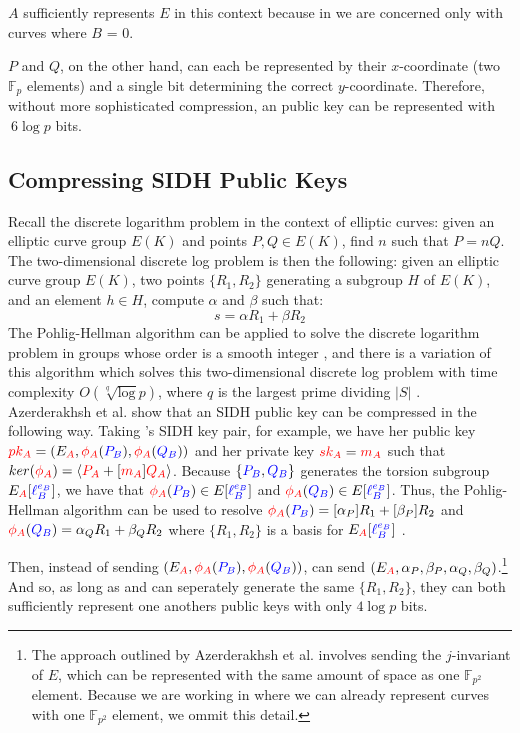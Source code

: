 $A$ sufficiently represents $E$ in this context because in \sidh we are concerned only with curves where $B$ = 0. 

$P$ and $Q$, on the other hand, can each be represented by their $x$-coordinate (two $\mathbb{F}_{p}$ elements) and a single bit determining the correct $y$-coordinate. Therefore, without more sophisticated compression, an \sidh public key can be represented with $~6\log p$ bits.

\subsection{Compressing SIDH Public Keys}
\label{subsec:azercompression}

Recall the discrete logarithm problem in the context of elliptic curves: given an elliptic curve group $E(K)$ and points $P, Q \in E(K)$, find $n$ such that $P = nQ$. The two-dimensional discrete log problem is then the following: given an elliptic curve group $E(K)$, two points $\{R_1, R_2\}$ generating a subgroup $H$ of $E(K)$, and an element $h \in H$, compute $\alpha$ and $\beta$ such that:
$$
s = \alpha R_1 + \beta R_2
$$
The Pohlig-Hellman algorithm can be applied to solve the discrete logarithm problem in groups whose order is a smooth integer \cite{ph}, and there is a variation of this algorithm which solves this two-dimensional discrete log problem with time complexity $O(\sqrt[q]\log p)$, where $q$ is the largest prime dividing $\vert S\vert$ \cite{genph}.\\

\noindent
Azerderakhsh et al. show that an SIDH public key can be compressed in the following way. Taking \alice's SIDH key pair, for example, we have her public key $\textcolor{red}{pk_A} = (E_{\textcolor{red}{A}}, \textcolor{red}{\phi_A}(\textcolor{blue}{P_B}),\textcolor{red}{\phi_A}(\textcolor{blue}{Q_B}))$ and her private key $\textcolor{red}{sk_A} = \textcolor{red}{m_A}$ such that $ker(\textcolor{red}{\phi_A}) = \langle \textcolor{red}{P_A} + [\textcolor{red}{m_A}]\textcolor{red}{Q_A}\rangle$. Because $\{\textcolor{blue}{P_B}, \textcolor{blue}{Q_B}\}$ generates the torsion subgroup $E_{\textcolor{red}{A}}[\textcolor{blue}{\ell_{B}^{e_B}}]$, we have that $\textcolor{red}{\phi_A}(\textcolor{blue}{P_B}) \in E[\textcolor{blue}{\ell_{B}^{e_B}}]$ and $\textcolor{red}{\phi_A}(\textcolor{blue}{Q_B}) \in E[\textcolor{blue}{\ell_{B}^{e_B}}]$. Thus, the Pohlig-Hellman algorithm can be used to resolve $\textcolor{red}{\phi_A}(\textcolor{blue}{P_B}) = [\alpha_P] R_1 + [\beta_P] R_2$ and $\textcolor{red}{\phi_A}(\textcolor{blue}{Q_B}) = \alpha_Q R_1 + \beta_Q R_2$ where $\{R_1, R_2\}$ is a basis for $E_{\textcolor{red}{A}}[\textcolor{blue}{\ell_{B}^{e_B}}]$ \cite{compwr}.

Then, instead of sending \bob $(E_{\textcolor{red}{A}}, \textcolor{red}{\phi_A}(\textcolor{blue}{P_B}),\textcolor{red}{\phi_A}(\textcolor{blue}{Q_B}))$, \alice can send $(E_{\textcolor{red}{A}}, \alpha_P, \beta_P, \alpha_Q, \beta_Q)$.\footnote{The approach outlined by Azerderakhsh et al. involves sending the $j$-invariant of $E$, which can be represented with the same amount of space as one $\mathbb{F}_{p^2}$ element. Because we are working in \sidh where we can already represent curves with one $\mathbb{F}_{p^2}$ element, we ommit this detail.} And so, as long as \alice and \bob can seperately generate the same $\{R_1, R_2\}$, they can both sufficiently represent one anothers public keys with only $4\log p$ bits.\\

